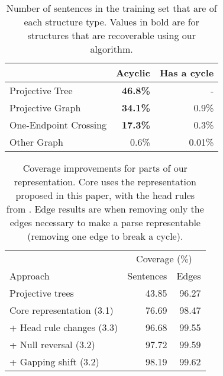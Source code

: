 \begin{table}
  \centering
  \begin{tabular}{|lrr|}
    \hline
      & Acyclic & Has a cycle \\
    \hline
    \hline
    Projective Tree & \textbf{46.8\%} & - \\
    Projective Graph & \textbf{34.1\%} & 0.9\% \\
    One-Endpoint Crossing & \textbf{17.3\%} & 0.3\% \\
    Other Graph & 0.6\% & 0.01\% \\
    \hline
  \end{tabular}
  \caption{\label{tab:structures}
    Number of sentences in the training set that are of each structure type.
    Values in bold are for structures that are recoverable using our algorithm.
  }
\end{table}

\begin{table}
\centering
  \vspace{2mm}
  \begin{tabular}{|lrr|}
    \hline
    & \multicolumn{2}{c}{Coverage (\%)} \\
    Approach & Sentences & Edges \\
    \hline
    \hline
    Projective trees & 43.85 & 96.27 \\
    Core representation (3.1) & 76.69 & 98.47 \\
    + Head rule changes (3.3) & 96.68 & 99.55 \\
    + Null reversal (3.2) & 97.72 & 99.59 \\
    + Gapping shift (3.2) & 98.19 & 99.62 \\
    \hline
  \end{tabular}
  \caption{\label{tab:coverage}
    Coverage improvements for parts of our representation.
    Core uses the representation proposed in this paper, with the head rules from \textcite{cck}.
    Edge results are when removing only the edges necessary to make a parse representable (\myeg removing one edge to break a cycle).
  }
\end{table}

